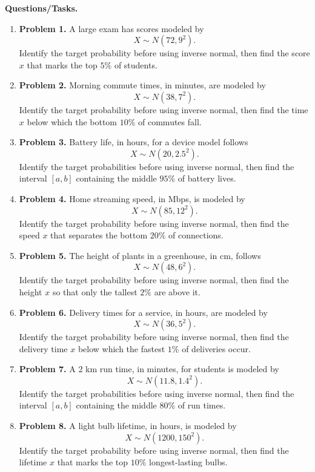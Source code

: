 	\textbf{Questions/Tasks.}
	\begin{enumerate}
	\item \textbf{Problem 1.} A large exam has scores modeled by
	\[
	X \sim N(72, 9^2).
	\]
	Identify the target probability before using inverse normal, then find the score \(x\) that marks the top \(5\%\) of students.
	
	\item \textbf{Problem 2.} Morning commute times, in minutes, are modeled by
	\[
	X \sim N(38, 7^2).
	\]
	Identify the target probability before using inverse normal, then find the time \(x\) below which the bottom \(10\%\) of commutes fall.
	
	\item \textbf{Problem 3.} Battery life, in hours, for a device model follows
	\[
	X \sim N(20, 2.5^2).
	\]
	Identify the target probabilities before using inverse normal, then find the interval \([a,b]\) containing the middle \(95\%\) of battery lives.
	
	\item \textbf{Problem 4.} Home streaming speed, in Mbps, is modeled by
	\[
	X \sim N(85, 12^2).
	\]
	Identify the target probability before using inverse normal, then find the speed \(x\) that separates the bottom \(20\%\) of connections.
	
	\item \textbf{Problem 5.} The height of plants in a greenhouse, in cm, follows
	\[
	X \sim N(48, 6^2).
	\]
	Identify the target probability before using inverse normal, then find the height \(x\) so that only the tallest \(2\%\) are above it.
	
	\item \textbf{Problem 6.} Delivery times for a service, in hours, are modeled by
	\[
	X \sim N(36, 5^2).
	\]
	Identify the target probability before using inverse normal, then find the delivery time \(x\) below which the fastest \(1\%\) of deliveries occur.
	
	\item \textbf{Problem 7.} A \(2\) km run time, in minutes, for students is modeled by
	\[
	X \sim N(11.8, 1.4^2).
	\]
	Identify the target probabilities before using inverse normal, then find the interval \([a,b]\) containing the middle \(80\%\) of run times.
	
	\item \textbf{Problem 8.} A light bulb lifetime, in hours, is modeled by
	\[
	X \sim N(1200, 150^2).
	\]
	Identify the target probability before using inverse normal, then find the lifetime \(x\) that marks the top \(10\%\) longest-lasting bulbs.
	

\end{enumerate}
